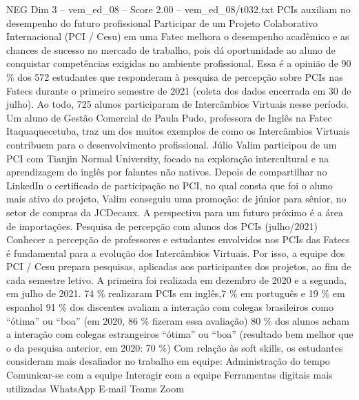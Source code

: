 \begin{textsample}{NEG Dim 3 – vem\_ed\_08 – Score 2.00 – vem\_ed\_08/t032.txt}  \label{ex:f3_neg_090}
PCIs auxiliam no desempenho do futuro profissional Participar de um Projeto Colaborativo Internacional (PCI / Cesu) em uma Fatec melhora o desempenho acadêmico e as chances de sucesso no mercado de trabalho, pois dá oportunidade ao aluno de conquistar competências exigidas no ambiente profissional.
Essa é a opinião de 90 \% dos 572 estudantes que responderam à pesquisa de percepção sobre PCIs nas Fatecs durante o primeiro semestre de 2021 (coleta dos dados encerrada em 30 de julho).
Ao todo, 725 alunos participaram de Intercâmbios Virtuais nesse período.
Um aluno de Gestão Comercial de Paula Pudo, professora de Inglês na Fatec Itaquaquecetuba, traz um dos muitos exemplos de como os Intercâmbios Virtuais contribuem para o desenvolvimento profissional.
Júlio Valim participou de um PCI com Tianjin Normal University, focado na exploração intercultural e na aprendizagem do inglês por falantes não nativos.
Depois de compartilhar no LinkedIn o certificado de participação no PCI, no qual consta que foi o aluno mais ativo do projeto, Valim conseguiu uma promoção: de júnior para sênior, no setor de compras da JCDecaux.
A perspectiva para um futuro próximo é a área de importações.
Pesquisa de percepção com alunos dos PCIs (julho/2021) Conhecer a percepção de professores e estudantes envolvidos nos PCIs das Fatecs é fundamental para a evolução dos Intercâmbios Virtuais.
Por isso, a equipe dos PCI / Cesu prepara pesquisas, aplicadas aos participantes dos projetos, ao fim de cada semestre letivo.
A primeira foi realizada em dezembro de 2020 e a segunda, em julho de 2021. 74 \% realizaram PCIs em inglês,7 \% em português e 19 \% em espanhol 91 \% dos discentes avaliam a interação com colegas brasileiros como “ótima” ou “boa” (em 2020, 86 \% fizeram essa avaliação) 80 \% dos alunos acham a interação com colegas estrangeiros “ótima” ou “boa” (resultado bem melhor que o da pesquisa anterior, em 2020: 70 \%) Com relação às soft skills, os estudantes consideram mais desafiador no trabalho em equipe: Administração do tempo Comunicar-se com a equipe Interagir com a equipe Ferramentas digitais mais utilizadas WhatsApp E-mail Teams Zoom

\end{textsample}
